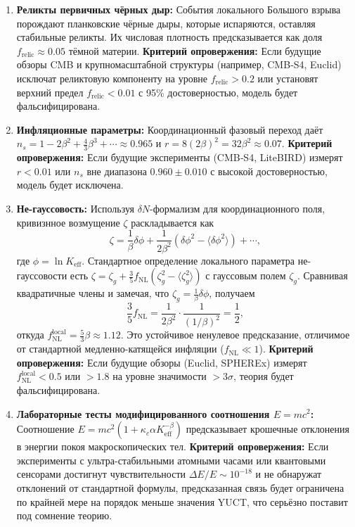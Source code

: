 \documentclass[11pt,a4paper]{article}
\newcommand{\Keff}{K_{\mathrm{eff}}}
\begin{document}
	\begin{enumerate}
		\item \textbf{Реликты первичных чёрных дыр:} События локального Большого взрыва порождают планковские чёрные дыры, которые испаряются, оставляя стабильные реликты. Их числовая плотность предсказывается как доля \(f_{\mathrm{relic}} \approx 0.05\) тёмной материи. \textbf{Критерий опровержения:} Если будущие обзоры CMB и крупномасштабной структуры (например, CMB‑S4, Euclid) исключат реликтовую компоненту на уровне \(f_{\mathrm{relic}} > 0.2\) или установят верхний предел \(f_{\mathrm{relic}} < 0.01\) с 95\% достоверностью, модель будет фальсифицирована.
		\item \textbf{Инфляционные параметры:} Координационный фазовый переход даёт \(n_s = 1 - 2\beta^2 + \frac{4}{3}\beta^3 + \cdots \approx 0.965\) и \(r = 8(2\beta)^2 = 32\beta^2 \approx 0.07\). \textbf{Критерий опровержения:} Если будущие эксперименты (CMB‑S4, LiteBIRD) измерят \(r < 0.01\) или \(n_s\) вне диапазона \(0.960 \pm 0.010\) с высокой достоверностью, модель будет исключена.
		\item \textbf{Не-гауссовость:} Используя \(\delta N\)-формализм для координационного поля, кривизнное возмущение \(\zeta\) раскладывается как
		\[
		\zeta = \frac{1}{\beta} \delta\phi + \frac{1}{2\beta^2} (\delta\phi^2 - \langle\delta\phi^2\rangle) + \cdots,
		\]
		где \(\phi = \ln \Keff\). Стандартное определение локального параметра не-гауссовости есть \(\zeta = \zeta_g + \frac{3}{5} f_{\mathrm{NL}} (\zeta_g^2 - \langle\zeta_g^2\rangle)\) с гауссовым полем \(\zeta_g\). Сравнивая квадратичные члены и замечая, что \(\zeta_g = \frac{1}{\beta}\delta\phi\), получаем
		\[
		\frac{3}{5} f_{\mathrm{NL}} = \frac{1}{2\beta^2} \cdot \frac{1}{(1/\beta)^2} = \frac{1}{2},
		\]
		откуда \(f_{\mathrm{NL}}^{\mathrm{local}} = \frac{5}{3}\beta \approx 1.12\). Это устойчивое ненулевое предсказание, отличимое от стандартной медленно-катящейся инфляции (\(f_{\mathrm{NL}} \ll 1\)). \textbf{Критерий опровержения:} Если будущие обзоры (Euclid, SPHEREx) измерят \(f_{\mathrm{NL}}^{\mathrm{local}} < 0.5\) или \(> 1.8\) на уровне значимости \(>3\sigma\), теория будет фальсифицирована.
		\item \textbf{Лабораторные тесты модифицированного соотношения \(E=mc^2\):} Соотношение \(E = m c^2 (1 + \kappa_c \alpha K_{\mathrm{eff}}^{-\beta})\) предсказывает крошечные отклонения в энергии покоя макроскопических тел. \textbf{Критерий опровержения:} Если эксперименты с ультра-стабильными атомными часами или квантовыми сенсорами достигнут чувствительности \(\Delta E / E \sim 10^{-18}\) и не обнаружат отклонений от стандартной формулы, предсказанная связь будет ограничена по крайней мере на порядок меньше значения YUCT, что серьёзно поставит под сомнение теорию.
	\end{enumerate}
	
\end{document}
